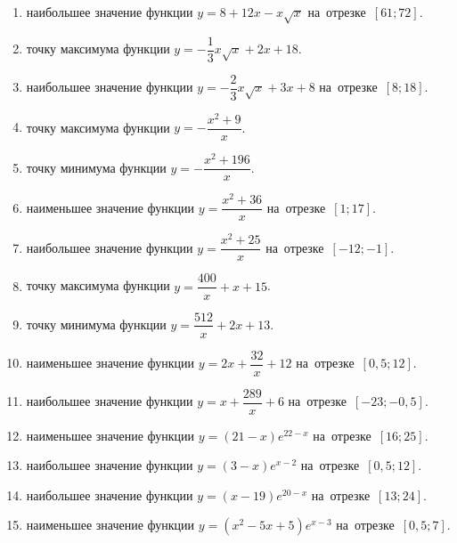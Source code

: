 \documentclass[a4paper,10pt]{article}
\begin{document}
\begin{enumerate}
\item {} наибольшее значение функции $y=8+12x -x\sqrt{x}$ на~отрезке~$\left[61;72\right]$.

\item {} точку максимума функции $y=-\dfrac{1}{3}x\sqrt{x} +2x+18$.

\item {} наибольшее значение функции $y=-\dfrac{2}{3}x\sqrt{x} +3x+8$ на~отрезке~$\left[8;18\right]$.

\item {} точку максимума функции $y=-\dfrac{x^2 +9}{x}$.

\item {} точку минимума функции $y=-\dfrac{x^2 +196}{x}$.

\item {} наименьшее значение функции $y=\dfrac{x^2 +36}{x}$ на~отрезке~$\left[1;17\right]$.

\item {} наибольшее значение функции $y=\dfrac{x^2 +25}{x}$ на~отрезке~$\left[-12;-1\right]$.

\item {} точку максимума функции $y=\dfrac{400}{x} +x+15$.

\item {} точку минимума функции $y=\dfrac{512}{x} +2x+13$.

\item {} наименьшее значение функции $y=2x+\dfrac{32}{x} +12$ на~отрезке~$\left[0,5;12\right]$.

\item {} наибольшее значение функции $y=x+\dfrac{289}{x} +6$ на~отрезке~$\left[-23;-0,5\right]$.

\item {} наименьшее значение функции $y=\left(21-x\right)e^{22-x}$ на~отрезке~$\left[16;25\right]$.

\item {} наибольшее значение функции $y=\left(3-x\right)e^{x-2}$ на~отрезке~$\left[0,5;12\right]$.

\item {} наибольшее значение функции $y=\left(x-19\right)e^{20-x}$ на~отрезке~$\left[13;24\right]$.

\item {} наименьшее значение функции $y=\left(x^2 -5x +5\right)e^{x -3}$ на~отрезке~$\left[0,5;7\right]$.


\end{enumerate}
\end{document}
